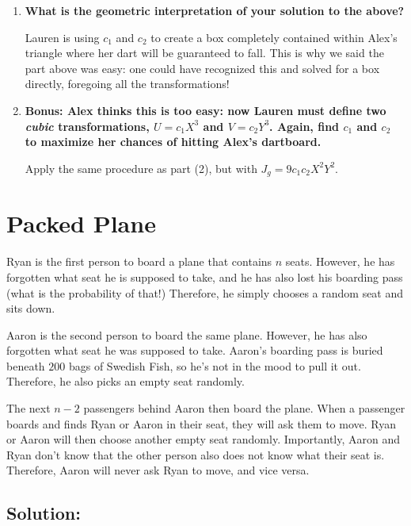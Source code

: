 \documentclass{article}
\begin{document}
\begin{enumerate}[label=(\alph*)]
    \vspace{2cm}
    
    \item \textbf{What is the geometric interpretation of your solution to the above?}

    Lauren is using $c_1$ and $c_2$ to create a box completely contained
    within Alex's triangle where her dart will be guaranteed to fall. This is why we said
    the part above was easy: one could have recognized this and solved for a box directly,
    foregoing all the transformations!

    \vspace{2cm}
        
    \item \textbf{Bonus: Alex thinks this is too easy: now Lauren must define two \textit{cubic}
    transformations, $U = c_1 X^3$ and $V = c_2 Y^3$. Again, find $c_1$ and $c_2$
    to maximize her chances of hitting Alex's dartboard.}

    Apply the same procedure as part (2), but with $J_g = 9c_1c_2 X^2 Y^2$.
    
\end{enumerate}

\newpage

\section{Packed Plane}

Ryan is the first person to board a plane that contains $n$ seats. However, he has forgotten what seat he is supposed to take, and he has also lost his boarding pass (what is the probability of that!) Therefore, he simply chooses a random seat and sits down.

Aaron is the second person to board the same plane. However, he has also forgotten what seat he was supposed to take. Aaron's boarding pass is buried beneath $200$ bags of Swedish Fish, so he's not in the mood to pull it out. Therefore, he also picks an empty seat randomly.

The next $n - 2$ passengers behind Aaron then board the plane. When a passenger boards and finds Ryan or Aaron in their seat, they will ask them to move. Ryan or Aaron will then choose another empty seat randomly. Importantly, Aaron and Ryan don't know that the other person also does not know what their seat is. Therefore, Aaron will never ask Ryan to move, and vice versa.

\subsection{Solution:}
\end{document}
